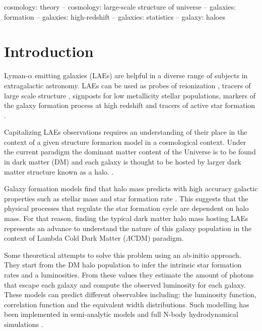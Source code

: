 \documentclass[usenatbib]{mn2e}
\newcommand{\ly}{{\ifmmode{{\rm Ly}\alpha}\else{Ly$\alpha$~}\fi}}
\begin{document}
\begin{keywords}
{cosmology: theory – cosmology: large-scale structure of universe –
  galaxies: formation – galaxies: high-redshift – galaxies: statistics
  – galaxy: haloes} 
\end{keywords}


\section{Introduction}

Lyman-$\alpha$ emitting galaxies (LAEs) are helpful in a diverse range
of subjects in extragalactic astronomy. LAEs can be
used as probes of reionization \citep{Dijkstra11}, tracers of large
scale structure \citep{Koehler2007},  signposts for low metallicity
stellar populations, markers of the galaxy formation process at high
redshift \citep{Dayal2009,ForeroRomero2012} and tracers of active star
formation \citep{Guaita2013}. 

Capitalizing LAEs observations requires an understanding of
their place in the context of a given structure formarion model in a
cosmological context. Under the current paradigm the dominant matter
content of the Universe is to be found in dark matter (DM) and each
galaxy is thought to be hosted by larger dark matter structure known
as a halo. \citep{Peebles1980,SpringelNature05}. 

Galaxy formation models find that halo mass predicts with high
accuracy galactic properties such as stellar mass and star formation
rate \citep{Behroozi2013a}. This suggests that the
physical processes that regulate the star formation cycle are 
dependent on halo mass.  For that reason, finding the typical dark
matter halo mass hosting LAEs represents an advance to understand the
nature of this galaxy population in the context of Lambda Cold Dark
Matter ($\Lambda$CDM) paradigm.  

Some theoretical attempts to solve this problem using an  ab-initio
approach. They start from the DM halo population to infer the
intrinsic star formation rates and \ly a luminosities. From these
values they estimate the amount of \ly photons that
escape each galaxy and compute the observed luminosity for each
galaxy. These models can predict different observables including: the
luminosity function, correlation function and the equivalent width
distributions. Such modelling has been implemented in semi-analytic
models \citep{Garel2012,Orsi2012,Soler2012} and  full N-body
hydrodynamical simulations \citep{Laursen2007, Dayal2009,
  ForeroRomero2011, Yajima2012}. 
\end{document}
